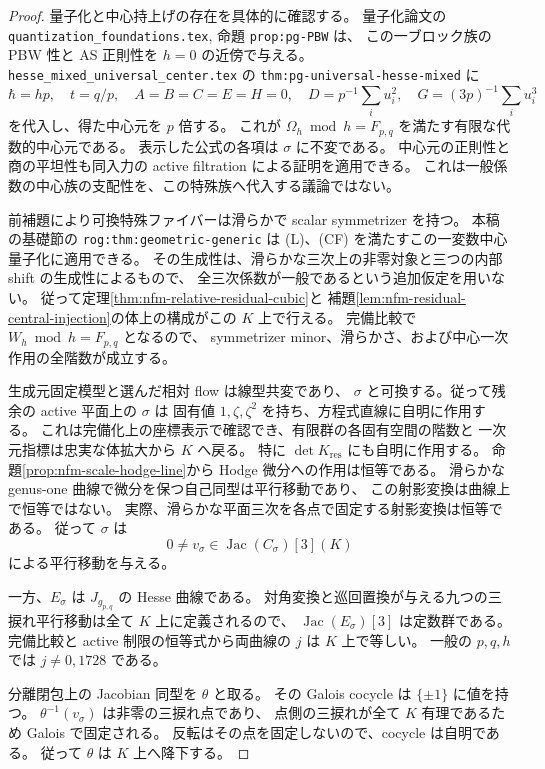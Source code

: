 \begin{proof}
量子化と中心持上げの存在を具体的に確認する。
量子化論文\cite{CubicQuantization}の
\texttt{quantization\_\allowbreak foundations.tex}, 命題 \texttt{prop:pg-PBW} は、
この一ブロック族の PBW 性と AS 正則性を $h=0$ の近傍で与える。
\texttt{hesse\_mixed\_universal\_center.tex} の
\texttt{thm:pg-universal-hesse-mixed} に
\[
 \hbar=hp,\quad t=q/p,\quad
 A=B=C=E=H=0,\quad
 D=p^{-1}\sum_i u_i^2,\quad G=(3p)^{-1}\sum_i u_i^3
\]
を代入し、得た中心元を $p$ 倍する。
これが $\Omega_h\bmod h=F_{p,q}$ を満たす有限な代数的中心元である。
表示した公式の各項は $\sigma$ に不変である。
中心元の正則性と商の平坦性も同入力の active filtration による証明を適用できる。
これは一般係数の中心族の支配性を、この特殊族へ代入する議論ではない。

前補題により可換特殊ファイバーは滑らかで scalar symmetrizer を持つ。
本稿の基礎節の \texttt{rog:thm:geometric-generic} は
(L)、(CF) を満たすこの一変数中心量子化に適用できる。
その生成性は、滑らかな三次上の非零対象と三つの内部 shift の生成性によるもので、
全三次係数が一般であるという追加仮定を用いない。
従って定理\ref{thm:nfm-relative-residual-cubic}と
補題\ref{lem:nfm-residual-central-injection}の体上の構成がこの $K$ 上で行える。
完備比較で $W_h\bmod h=F_{p,q}$ となるので、
symmetrizer minor、滑らかさ、および中心一次作用の全階数が成立する。

生成元固定模型と選んだ相対 flow は線型共変であり、
$\sigma$ と可換する。従って残余の active 平面上の $\sigma$ は
固有値 $1,\zeta,\zeta^2$ を持ち、方程式直線に自明に作用する。
これは完備化上の座標表示で確認でき、有限群の各固有空間の階数と
一次元指標は忠実な体拡大から $K$ へ戻る。
特に $\det K_{\mathrm{res}}$ にも自明に作用する。
命題\ref{prop:nfm-scale-hodge-line}から Hodge 微分への作用は恒等である。
滑らかな genus-one 曲線で微分を保つ自己同型は平行移動であり、
この射影変換は曲線上で恒等ではない。
実際、滑らかな平面三次を各点で固定する射影変換は恒等である。
従って $\sigma$ は
\[
 0\ne v_\sigma\in\operatorname{Jac}(C_\sigma)[3](K)
\]
による平行移動を与える。

一方、$E_\sigma$ は $J_{g_{p,q}}$ の Hesse 曲線である。
対角変換と巡回置換が与える九つの三捩れ平行移動は全て $K$ 上に定義されるので、
$\operatorname{Jac}(E_\sigma)[3]$ は定数群である。
完備比較と active 制限の恒等式から両曲線の $j$ は $K$ 上で等しい。
一般の $p,q,h$ では $j\ne0,1728$ である。

分離閉包上の Jacobian 同型を $\theta$ と取る。
その Galois cocycle は $\{\pm1\}$ に値を持つ。
$\theta^{-1}(v_\sigma)$ は非零の三捩れ点であり、
点側の三捩れが全て $K$ 有理であるため Galois で固定される。
反転はその点を固定しないので、cocycle は自明である。
従って $\theta$ は $K$ 上へ降下する。
\end{proof}

